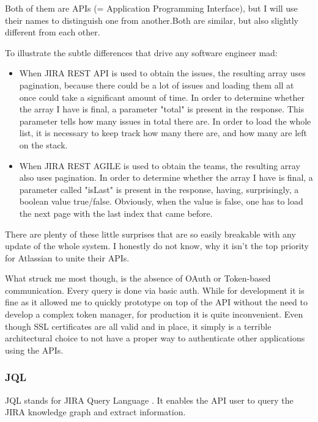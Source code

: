Both of them are APIs (= Application Programming Interface), but I will use their names to distinguish one from another.Both are similar, but also slightly different from each other. 

To illustrate the subtle differences that drive any software engineer mad:

\begin{itemize}
	\item When JIRA REST API is used to obtain the issues, the resulting array uses pagination, because there could be a lot of issues and loading them all at once could take a significant amount of time. In order to determine whether the array I have is final, a parameter "total" is present in the response. This parameter tells how many issues in total there are. In order to load the whole list, it is necessary to keep track how many there are, and how many are left on the stack.
	
	\item When JIRA REST AGILE is used to obtain the teams, the resulting array also uses pagination. In order to determine whether the array I have is final, a parameter called "isLast" is present in the response, having, surprisingly, a boolean value true/false. Obviously, when the value is false, one has to load the next page with the last index that came before.
\end{itemize}

There are plenty of these little surprises that are so easily breakable with any update of the whole system. I honestly do not know, why it isn't the top priority for Atlassian to unite their APIs.

What struck me most though, is the absence of OAuth or Token-based communication. Every query is done via basic auth. While for development it is fine as it allowed me to quickly prototype on top of the API without the need to develop a complex token manager, for production it is quite inconvenient. Even though SSL certificates are all valid and in place, it simply is a terrible architectural choice to not have a proper way to authenticate other applications using the APIs.

\subsubsection{JQL}

JQL stands for JIRA Query Language \cite{jql}. It enables the API user to query the JIRA knowledge graph and extract information.

